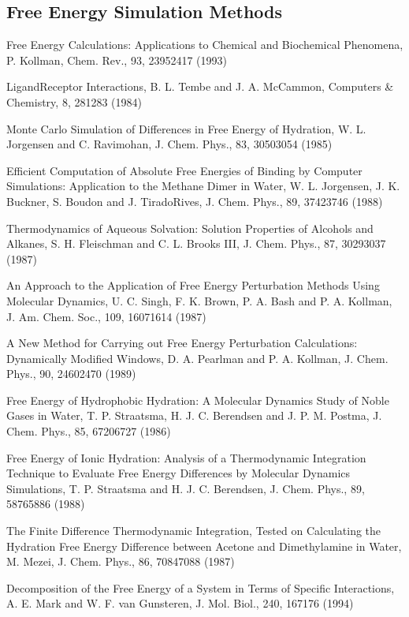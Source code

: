 \documentclass[letterpaper,11pt,english]{sphinxmanual}
\begin{document}
\subsection{Free Energy Simulation Methods}
\label{\detokenize{text/references:free-energy-simulation-methods}}
Free Energy Calculations: Applications to Chemical and Biochemical Phenomena, P. Kollman, Chem. Rev., 93, 2395\sphinxhyphen{}2417 (1993)

Ligand\sphinxhyphen{}Receptor Interactions, B. L. Tembe and J. A. McCammon, Computers \& Chemistry, 8, 281\sphinxhyphen{}283 (1984)

Monte Carlo Simulation of Differences in Free Energy of Hydration, W. L. Jorgensen and C. Ravimohan, J. Chem. Phys., 83, 3050\sphinxhyphen{}3054 (1985)

Efficient Computation of Absolute Free Energies of Binding by Computer Simulations:  Application to the Methane Dimer in Water, W. L. Jorgensen, J. K. Buckner, S. Boudon and J. Tirado\sphinxhyphen{}Rives, J. Chem. Phys., 89, 3742\sphinxhyphen{}3746 (1988)

Thermodynamics of Aqueous Solvation:  Solution Properties of Alcohols and Alkanes, S. H. Fleischman and C. L. Brooks III, J. Chem. Phys., 87, 3029\sphinxhyphen{}3037 (1987)

An Approach to the Application of Free Energy Perturbation Methods Using Molecular Dynamics, U. C. Singh, F. K. Brown, P. A. Bash and P. A. Kollman, J. Am. Chem. Soc., 109, 1607\sphinxhyphen{}1614 (1987)

A New Method for Carrying out Free Energy Perturbation Calculations: Dynamically Modified Windows, D. A. Pearlman and P. A. Kollman, J. Chem. Phys., 90, 2460\sphinxhyphen{}2470 (1989)

Free Energy of Hydrophobic Hydration:  A Molecular Dynamics Study of Noble Gases in Water, T. P. Straatsma, H. J. C. Berendsen and J. P. M. Postma, J. Chem. Phys., 85, 6720\sphinxhyphen{}6727 (1986)

Free Energy of Ionic Hydration:  Analysis of a Thermodynamic Integration Technique to Evaluate Free Energy Differences by Molecular Dynamics Simulations, T. P. Straatsma and H. J. C. Berendsen, J. Chem. Phys., 89, 5876\sphinxhyphen{}5886 (1988)

The Finite Difference Thermodynamic Integration, Tested on Calculating the Hydration Free Energy Difference between Acetone and Dimethylamine in Water, M. Mezei, J. Chem. Phys., 86, 7084\sphinxhyphen{}7088 (1987)

Decomposition of the Free Energy of a System in Terms of Specific Interactions, A. E. Mark and W. F. van Gunsteren, J. Mol. Biol., 240, 167\sphinxhyphen{}176 (1994)
\end{document}
